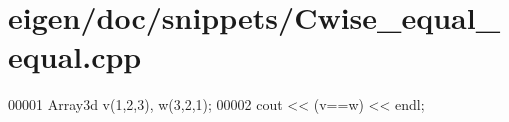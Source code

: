 \hypertarget{eigen_2doc_2snippets_2_cwise__equal__equal_8cpp_source}{}\section{eigen/doc/snippets/\+Cwise\+\_\+equal\+\_\+equal.cpp}
\label{eigen_2doc_2snippets_2_cwise__equal__equal_8cpp_source}

\begin{DoxyCode}
00001 Array3d v(1,2,3), w(3,2,1);
00002 cout << (v==w) << endl;
\end{DoxyCode}
